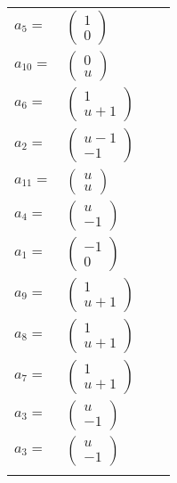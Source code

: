 \documentclass[1p]{elsarticle_modified}
\theoremstyle{definition}
\begin{document}
\begin{tabular}{m{7pt} m{180pt} m{7pt} m{180pt} }
\flushright $a_{5}=$&$\begin{pmatrix}1\\0\end{pmatrix}$ \\
\flushright $a_{10}=$&$\begin{pmatrix}0\\u\end{pmatrix}$ \\
\flushright $a_{6}=$&$\begin{pmatrix}1\\u+1\end{pmatrix}$ \\
\flushright $a_{2}=$&$\begin{pmatrix}u-1\\-1\end{pmatrix}$ \\
\flushright $a_{11}=$&$\begin{pmatrix}u\\u\end{pmatrix}$ \\
\flushright $a_{4}=$&$\begin{pmatrix}u\\-1\end{pmatrix}$ \\
\flushright $a_{1}=$&$\begin{pmatrix}-1\\0\end{pmatrix}$ \\
\flushright $a_{9}=$&$\begin{pmatrix}1\\u+1\end{pmatrix}$ \\
\flushright $a_{8}=$&$\begin{pmatrix}1\\u+1\end{pmatrix}$ \\
\flushright $a_{7}=$&$\begin{pmatrix}1\\u+1\end{pmatrix}$ \\
\flushright $a_{3}=$&$\begin{pmatrix}u\\-1\end{pmatrix}$\\ \flushright $a_{3}=$&$\begin{pmatrix}u\\-1\end{pmatrix}$\\&\end{tabular}
\end{document}
